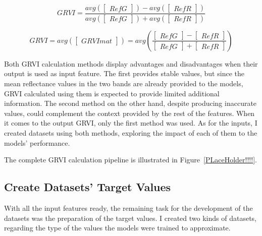 \begin{equation}
    GRVI = \frac{avg(\begin{bmatrix}RefG\end{bmatrix}) - avg(\begin{bmatrix}RefR\end{bmatrix})}{avg(\begin{bmatrix}RefG\end{bmatrix}) + avg(\begin{bmatrix}RefR\end{bmatrix})}
    \label{avgRefGrvi}
\end{equation}

\begin{equation}
    GRVI = avg(\begin{bmatrix}GRVImat\end{bmatrix}) = avg(\frac{\begin{bmatrix}RefG\end{bmatrix} - \begin{bmatrix}RefR\end{bmatrix}}{\begin{bmatrix}RefG\end{bmatrix} + \begin{bmatrix}RefR\end{bmatrix}})
    \label{avgGRVI}
\end{equation}

Both GRVI calculation methods display advantages and disadvantages when their output is used as input feature. The first provides stable values, but since the mean reflectance values in the two bands are already provided to the models, GRVI calculated using them is expected to provide limited additional information. The second method on the other hand, despite producing inaccurate values, could complement the context provided by the rest of the features. When it comes to the output GRVI, only the first method was used. As for the inputs, I created datasets using both methods, exploring the impact of each of them to the models' performance. 

The complete GRVI calculation pipeline is illustrated in Figure~\ref{PLaceHolder!!!!}.

\subsection{Create Datasets' Target Values}

With all the input features ready, the remaining task for the development of the datasets was the preparation of the target values. I created two kinds of datasets, regarding the type of the values the models were trained to approximate.

